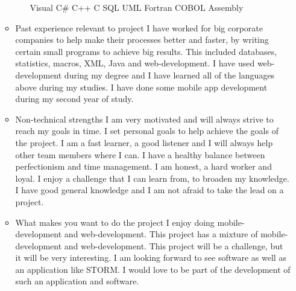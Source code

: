 \documentclass[12pt, oneside]{article}
\begin{document}
\begin{enumerate}
\begin{itemize}
\begin{itemize}
					Visual C\#\newline
					C++\newline
					C\newline
					SQL\newline
					UML\newline	
					Fortran\newline
					COBOL\newline
					Assembly\newline
				\end{itemize}
			\item Past experience relevant to project\newline\newline
				I have worked for big corporate companies to help make their processes better and faster, by writing 						certain small programs to achieve big results. This included databases, statistics, macros, XML, Java and 						web-development. I have used web-development during my degree and I have learned all of the 							languages above during my studies. I have done some mobile app development during my second year of study.\newline
			\item Non-technical strengths\newline\newline
				I am very motivated and will always strive to reach my goals in time. I set personal goals to help achieve 						the goals of the project. I am a fast learner, a good listener and I will always help other team members 						where I can. I have a healthy balance between perfectionism and time management. I am honest, a hard 						worker and loyal. I enjoy a challenge that I can learn from, to broaden my knowledge. I have good 							general knowledge and I am not afraid to take the lead on a project.\newline
			\item What makes you want to do the project\newline\newline
				I enjoy doing mobile-development and web-development. This project has a mixture of mobile-							development and web-development. This project will be a challenge, but it will be very interesting. I am 						looking forward to see software as well as an application like STORM. I would love to be part of the 							development of such an application and software.\newline
		\end{itemize}
	\end{enumerate}
	
\end{document}
